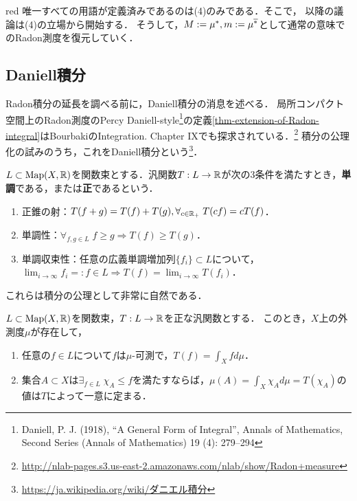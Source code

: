 \documentclass[uplatex,dvipdfmx]{jsreport}
\begin{document}
\begin{tbox}{red}{}
    唯一すべての用語が定義済みであるのは(4)のみである．そこで，
    以降の議論は(4)の立場から開始する．
    そうして，$M:=\mu^*,m:=\mu^{\overline{*}}$として通常の意味でのRadon測度を復元していく．
\end{tbox}

\subsection{Daniell積分}

\begin{tcolorbox}[colframe=ForestGreen, colback=ForestGreen!10!white,breakable,colbacktitle=ForestGreen!40!white,coltitle=black,fonttitle=\bfseries\sffamily,
title=]
    Radon積分の延長を調べる前に，Daniell積分の消息を述べる．
    局所コンパクト空間上のRadon測度のPercy Daniell-style\footnote{Daniell, P. J. (1918), “A General Form of Integral”, Annals of Mathematics, Second Series (Annals of Mathematics) 19 (4): 279–294}の定義\ref{thm-extension-of-Radon-integral}はBourbakiのIntegration. Chapter IXでも探求されている．\footnote{\url{http://nlab-pages.s3.us-east-2.amazonaws.com/nlab/show/Radon+measure}}
    積分の公理化の試みのうち，これをDaniell積分という\footnote{\url{https://ja.wikipedia.org/wiki/ダニエル積分}}．
\end{tcolorbox}

\begin{definition}
    $L\subset\mathrm{Map}(X,\mathbb{R})$を関数束とする．汎関数$T:L\to\mathbb{R}$が次の3条件を満たすとき，\textbf{単調}である，または\textbf{正}であるという．
    \begin{enumerate}
        \item 正錐の射：$T(f+g)=T(f)+T(g),\forall_{c\in\mathbb{R}_+}\;T(cf)=cT(f)$．
        \item 単調性：$\forall_{f,g\in L}\;f\ge g\Rightarrow T(f)\ge T(g)$．
        \item 単調収束性：任意の広義単調増加列$\{f_i\}\subset L$について，$\lim_{i\to\infty}f_i=:f\in L\Rightarrow T(f)=\lim_{i\to\infty}T(f_i)$．
    \end{enumerate}
    これらは積分の公理として非常に自然である．
\end{definition}

\begin{theorem}
    $L\subset\mathrm{Map}(X,\mathbb{R})$を関数束，$T:L\to\mathbb{R}$を正な汎関数とする．
    このとき，$X$上の外測度$\mu$が存在して，
    \begin{enumerate}
        \item 任意の$f\in L$について$f$は$\mu$-可測で，$T(f)=\int_Xfd\mu$．
        \item 集合$A\subset X$は$\exists_{f\in L}\;\chi_A\le f$を満たすならば，$\mu(A)=\int_X\chi_Ad\mu=T(\chi_A)$の値は$T$によって一意に定まる．
    \end{enumerate}
\end{theorem}
\end{document}
